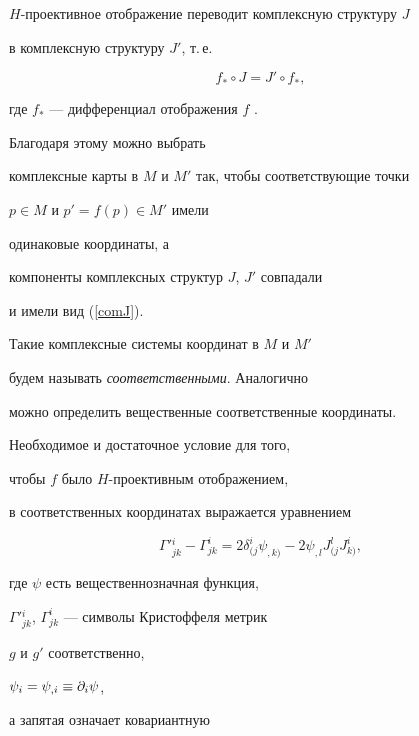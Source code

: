 $H$-проективное отображение переводит комплексную структуру $J$


в комплексную структуру $J'$, т.\,е.


\begin{equation}


\label{presJ}


f_* \circ J =J' \circ f_*,


\end{equation}


где $f_*$ --- дифференциал отображения $f$ \cite{skm}.


Благодаря этому можно выбрать


комплексные карты в $M$ и $M'$ так, чтобы соответствующие точки


$p \in M$ и $p' = f(p) \in M'$ имели


одинаковые координаты, а


компоненты комплексных структур $J$, $ J'$ совпадали


и имели вид (\ref{comJ}).


Такие комплексные системы координат в $M$ и $M'$


будем называть {\it соответственными}. Аналогично


можно определить вещественные соответственные координаты.





Необходимое и достаточное условие для того,


чтобы $f$ было $H$-проективным отображением,


в соответственных координатах выражается уравнением \cite{sin1}


\begin{equation}


\label{sh-bis1}


\Gamma'{}^{i}_{jk} - \Gamma^{i}_{jk} = 2 \delta ^{i}_{(j}


\psi _{,k)} - 2 \psi _{,l} J ^{l}_{(j} J^{i}_{k)},


\end{equation}


где $\psi$ есть вещественнозначная функция,


$\Gamma'{}^{i}_{jk}$, $\Gamma^{i}_{jk}$ --- символы Кристоффеля метрик


$g$ и $g'$ соответственно,


$\psi_i = \psi_{,i} \equiv \partial_ i \psi$,


а запятая означает ковариантную



